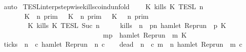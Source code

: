\begin{isabellebody}
\ auto\isanewline
{}\isamarkupfalse%
%
\endisatagproof
{\isafoldproof}%
%
\isadelimproof
\isanewline
%
\endisadelimproof
\isanewline
{}\isamarkupfalse%
\ TESL{\isacharunderscore}interp{\isacharunderscore}stepwise{\isacharunderscore}kills{\isacharunderscore}coind{\isacharunderscore}unfold{\isacharcolon}\isanewline
\ \ \ {\isacartoucheopen}{\isasymlbrakk}\ K\ kills\ K\ {\isasymrbrakk}\isactrlsub T\isactrlsub E\isactrlsub S\isactrlsub L\isactrlbsup {\isasymge}\ n\isactrlesup \ {\isacharequal}\isanewline
\ \ \ \ \ \ {\isacharparenleft}{\isasymlbrakk}\ K\ {\isasymnot}{\isasymUp}\ n\ {\isasymrbrakk}\isactrlsub p\isactrlsub r\isactrlsub i\isactrlsub m\ {\isasymunion}\ {\isasymlbrakk}\ K\ {\isasymUp}\ n\ {\isasymrbrakk}\isactrlsub p\isactrlsub r\isactrlsub i\isactrlsub m\ {\isasyminter}\ {\isasymlbrakk}\ K\ {\isasymnot}{\isasymUp}\ {\isasymge}\ n\ {\isasymrbrakk}\isactrlsub p\isactrlsub r\isactrlsub i\isactrlsub m{\isacharparenright}\isanewline
\ \ \ \ \ \ {\isasyminter}\ {\isasymlbrakk}\ K\ kills\ K\ {\isasymrbrakk}\isactrlsub T\isactrlsub E\isactrlsub S\isactrlsub L\isactrlbsup {\isasymge}\ Suc\ n\isactrlesup {\isacartoucheclose}\isanewline
%
\isadelimproof
%
\endisadelimproof
%
\isatagproof
{}\isamarkupfalse%
\ {\isacharminus}\isanewline
\ \ \isamarkupfalse%
\ {\isacharquery}kills\ {\isacharequal}\ {\isacartoucheopen}{\isasymlambda}n\ {\isasymrho}{\isachardot}\ {\isasymforall}p{\isasymge}n{\isachardot}\ hamlet\ {\isacharparenleft}{\isacharparenleft}Rep{\isacharunderscore}run\ {\isasymrho}{\isacharparenright}\ p\ K\isanewline
\ \ \ \ \ \ \ \ \ \ \ \ \ \ \ \ \ \ \ \ \ \ \ \ \ \ \ \ \ {\isasymlongrightarrow}\ {\isacharparenleft}{\isasymforall}m{\isasymge}p{\isachardot}\ {\isasymnot}\ hamlet\ {\isacharparenleft}{\isacharparenleft}Rep{\isacharunderscore}run\ {\isasymrho}{\isacharparenright}\ m\ K\isanewline
\ \ \isamarkupfalse%
\ {\isacharquery}ticks\ {\isacharequal}\ {\isacartoucheopen}{\isasymlambda}n\ {\isasymrho}\ c{\isachardot}\ hamlet\ {\isacharparenleft}{\isacharparenleft}Rep{\isacharunderscore}run\ {\isasymrho}{\isacharparenright}\ n\ c{\isacharparenright}{\isacartoucheclose}\isanewline
\ \ \isamarkupfalse%
\ {\isacharquery}dead\ {\isacharequal}\ {\isacartoucheopen}{\isasymlambda}n\ {\isasymrho}\ c{\isachardot}\ {\isasymforall}m\ {\isasymge}\ n{\isachardot}\ {\isasymnot}hamlet\ {\isacharparenleft}{\isacharparenleft}Rep{\isacharunderscore}run\ {\isasymrho}{\isacharparenright}\ m\ c{\isacharparenright}{\isacartoucheclose}\isanewline

\end{isabellebody}
